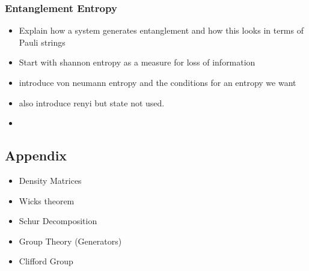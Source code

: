 \documentclass[nofootinbib]{revtex4-2}
\begin{document}
        \subsubsection{Entanglement Entropy}
        \begin{itemize}\color{ForestGreen}
            \item Explain how a system generates entanglement and how this looks in terms of Pauli strings
            \item Start with shannon entropy as a measure for loss of information 
            \item introduce von neumann entropy and the conditions for an entropy we want 
            \item also introduce renyi but state not used.
            \item 
        \end{itemize}



        \subsection{Appendix}
        \begin{itemize}\color{ForestGreen}
            \item Density Matrices
            \item Wicks theorem
            \item Schur Decomposition
            \item Group Theory (Generators)
            \item Clifford Group
        \end{itemize}






\cleardoublepage










\end{document}
